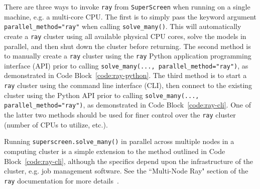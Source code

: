\documentclass[final,3p,times,twocolumn]{elsarticle}
\newcommand{\inline}[1]{\texttt{#1}\xspace}
\newcommand{\SuperScreen}{\inline{SuperScreen}}
\begin{document}
There are three ways to invoke \inline{ray} from \SuperScreen when running on a single machine, e.g. a multi-core CPU. The first is to simply pass the keyword argument \inline{parallel_method="ray"} when calling \inline{solve_many()}. This will automatically create a \inline{ray} cluster using all available physical CPU cores, solve the models in parallel, and then shut down the cluster before returning. The second method is to manually create a \inline{ray} cluster using the \inline{ray} Python application programming interface (API) prior to calling \inline{solve_many(..., parallel_method="ray")}, as demonstrated in Code Block~\ref{code:ray-python}. The third method is to start a \inline{ray} cluster using the command line interface (CLI), then connect to the existing cluster using the Python API prior to calling \inline{solve_many(..., parallel_method="ray")}, as demonstrated in Code Block~\ref{code:ray-cli}. One of the latter two methods should be used for finer control over the \inline{ray} cluster (number of CPUs to utilize, etc.).

Running \inline{superscreen.solve_many()} in parallel across multiple nodes in a computing cluster is a simple extension to the method outlined in Code Block~\ref{code:ray-cli}, although the specifics depend upon the infrastructure of the cluster, e.g. job management software. See the ``Multi-Node Ray" section of the \inline{ray} documentation for more details~\cite{ray-docs}.











\end{document}
